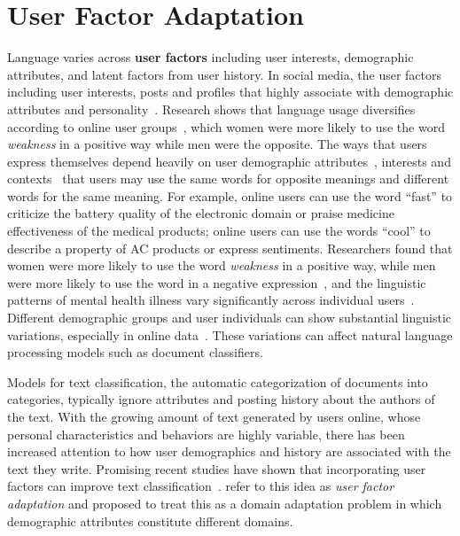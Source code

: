 \chapter{User Factor Adaptation}
\label{chp:user}

Language varies across \textbf{user factors} including user interests, demographic attributes, and latent factors from user history.
In social media, the user factors including user interests, posts and profiles that highly associate with demographic attributes and personality~\cite{lynn2017human}.
Research shows that language usage diversifies according to online user groups~\cite{volkova2013exploring}, which women were more likely to use the word \textit{weakness} in a positive way while men were the opposite.
The ways that users express themselves depend heavily on user demographic attributes~\cite{hovy2018improving}, interests and contexts~\cite{oba2019modeling} that users may use the same words for opposite meanings and different words for the same meaning.
For example, online users can use the word ``fast'' to criticize the battery quality of the electronic domain or praise medicine effectiveness of the medical products; online users can use the words ``cool'' to describe a property of AC products or express sentiments.
Researchers found that women were more likely to use the word \textit{weakness} in a positive way, while men were more likely to use the word in a negative expression~\cite{volkova2013exploring}, and the linguistic patterns of mental health illness vary significantly across individual users~\cite{amir2017quantifying}.
Different demographic groups and user individuals can show substantial linguistic variations, especially in online data~\cite{johannsen2015cross, goel2016social, pan2019social}. 
These variations can affect natural language processing models such as document classifiers.

Models for text classification, the automatic categorization of documents into categories, typically ignore attributes and posting history about the authors of the text.
With the growing amount of text generated by users online, whose personal characteristics and behaviors are highly variable,
there has been increased attention to how user demographics and history are associated with the text they write.
Promising recent studies have shown that incorporating user factors can improve text classification~\cite{volkova2013exploring, hovy2015demographic, amir2016modelling, yang2017overcoming, li2018towards, pan2019social}. 
\cite{lynn2017human} refer to this idea as {\em user factor adaptation}
and proposed to treat this as a domain adaptation problem in which demographic attributes constitute different domains.

